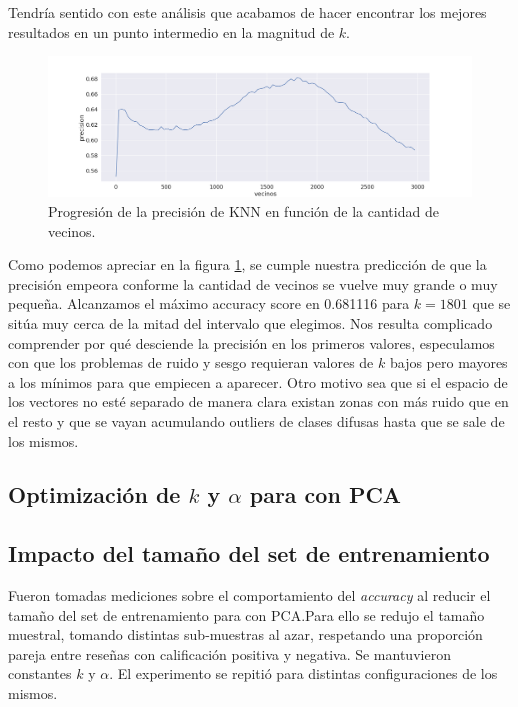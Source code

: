 Tendría sentido con este análisis que acabamos de hacer encontrar los mejores resultados en un punto intermedio en la magnitud de $k$.

\begin{figure}[h]
\includegraphics[width=\textwidth]{./img/knn.png}
\centering
\caption{Progresión de la precisión de KNN en función de la cantidad de vecinos.\label{fig:knn_acc}}

\end{figure}

Como podemos apreciar en la figura \ref{fig:knn_acc}, se cumple nuestra predicción de que la precisión empeora conforme la cantidad de vecinos se vuelve muy grande o muy pequeña. Alcanzamos el máximo accuracy score en 0.681116 para $k=1801$ que se sitúa muy cerca de la mitad del intervalo que elegimos. Nos resulta complicado comprender por qué desciende la precisión en los primeros valores, especulamos con que los problemas de ruido y sesgo requieran valores de $k$ bajos pero mayores a los mínimos para que empiecen a aparecer. Otro motivo sea que si el espacio de los vectores no esté separado de manera clara existan zonas con más ruido que en el resto y que se vayan acumulando outliers de clases difusas hasta que se sale de los mismos.

\subsection{Optimización de $k$ y $\alpha$ para \knn{} con PCA}%
\label{sub:alpha_k_knn_pca}

\subsection{Impacto del tamaño del set de entrenamiento}%
\label{sub:exp_training_set}

%
Fueron tomadas mediciones sobre el comportamiento del \textit{accuracy} al
reducir el tamaño del set de entrenamiento para \knn{} con PCA.\@ Para ello se
redujo el tamaño muestral, tomando distintas sub-muestras al azar, respetando
una proporción pareja entre reseñas con calificación positiva y negativa.
Se mantuvieron constantes $k$ y $\alpha$. El experimento se repitió para
distintas configuraciones de los mismos.

